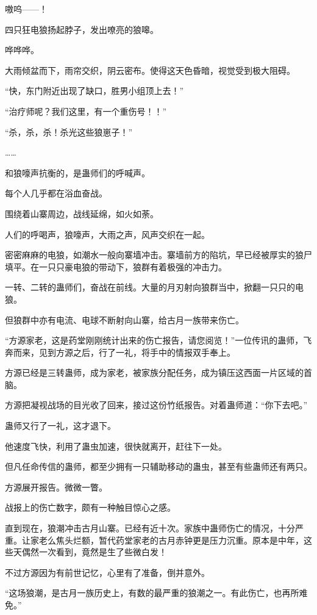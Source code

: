 
\begin{this_body}

嗷呜——！

四只狂电狼扬起脖子，发出嘹亮的狼嗥。

哗哗哗。

大雨倾盆而下，雨帘交织，阴云密布。使得这天色昏暗，视觉受到极大阻碍。

“快，东门附近出现了缺口，胜男小组顶上去！”

“治疗师呢？我们这里，有一个重伤号！！”

“杀，杀，杀！杀光这些狼崽子！”

……

和狼嚎声抗衡的，是蛊师们的呼喊声。

每个人几乎都在浴血奋战。

围绕着山寨周边，战线延绵，如火如荼。

人们的呼喝声，狼嚎声，大雨之声，风声交织在一起。

密密麻麻的电狼，如潮水一般向寨墙冲击。寨墙前方的陷坑，早已经被厚实的狼尸填平。在一只只豪电狼的带动下，狼群有着极强的冲击力。

一转、二转的蛊师们，奋战在前线。大量的月刃射向狼群当中，掀翻一只只的电狼。

但狼群中亦有电流、电球不断射向山寨，给古月一族带来伤亡。

“方源家老，这是药堂刚刚统计出来的伤亡报告，请您阅览！”一位传讯的蛊师，飞奔而来，见到方源之后，行了一礼，将手中的情报双手奉上。

方源已经是三转蛊师，成为家老，被家族分配任务，成为镇压这西面一片区域的首脑。

方源把凝视战场的目光收了回来，接过这份竹纸报告。对着蛊师道：“你下去吧。”

蛊师又行了一礼，这才退下。

他速度飞快，利用了蛊虫加速，很快就离开，赶往下一处。

但凡任命传信的蛊师，都至少拥有一只辅助移动的蛊虫，甚至有些蛊师还有两只。

方源展开报告。微微一瞥。

战报上的伤亡数字，颇有一种触目惊心之感。

直到现在，狼潮冲击古月山寨。已经有近十次。家族中蛊师伤亡的情况，十分严重。让家老么焦头烂额，暂代药堂家老的古月赤钟更是压力沉重。原本是中年，这些天偶然一次看到，竟然是生了些微白发！

不过方源因为有前世记忆，心里有了准备，倒并意外。

“这场狼潮，是古月一族历史上，有数的最严重的狼潮之一。有此伤亡，也再所难免。”


\end{this_body}

